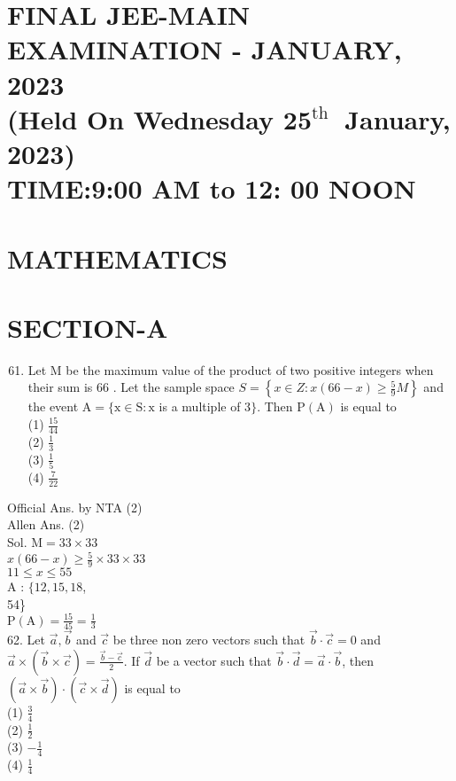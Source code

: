 \documentclass[10pt]{article}
\begin{document}
\section*{FINAL JEE-MAIN EXAMINATION - JANUARY, 2023 \\
 (Held On Wednesday \(\mathbf{2 5}^{\text {th }}\) January, 2023) \\
 TIME:9:00 AM to 12: 00 NOON}
\section*{MATHEMATICS}
\section*{SECTION-A}
\begin{enumerate}
  \setcounter{enumi}{60}
  \item Let M be the maximum value of the product of two positive integers when their sum is 66 . Let the sample space \(S=\left\{x \in Z: x(66-x) \geq \frac{5}{9} M\right\}\) and the event \(\mathrm{A}=\{\mathrm{x} \in \mathrm{S}: \mathrm{x}\) is a multiple of 3\(\}\). Then \(\mathrm{P}(\mathrm{A})\) is equal to\\
(1) \(\frac{15}{44}\)\\
(2) \(\frac{1}{3}\)\\
(3) \(\frac{1}{5}\)\\
(4) \(\frac{7}{22}\)
\end{enumerate}

Official Ans. by NTA (2)\\
Allen Ans. (2)\\
Sol. \(\mathrm{M}=33 \times 33\)\\
\(x(66-x) \geq \frac{5}{9} \times 33 \times 33\)\\
\(11 \leq x \leq 55\)\\
A : \(\{12,15,18\),\\
54\}\\
\(\mathrm{P}(\mathrm{A})=\frac{15}{45}=\frac{1}{3}\)\\
62. Let \(\vec{a}, \vec{b}\) and \(\vec{c}\) be three non zero vectors such that \(\vec{b} \cdot \vec{c}=0\) and \(\vec{a} \times(\vec{b} \times \vec{c})=\frac{\vec{b}-\vec{c}}{2}\). If \(\vec{d}\) be a vector such that \(\vec{b} \cdot \vec{d}=\vec{a} \cdot \vec{b}\), then \((\vec{a} \times \vec{b}) \cdot(\vec{c} \times \vec{d})\) is equal to\\
(1) \(\frac{3}{4}\)\\
(2) \(\frac{1}{2}\)\\
(3) \(-\frac{1}{4}\)\\
(4) \(\frac{1}{4}\)
\end{document}
